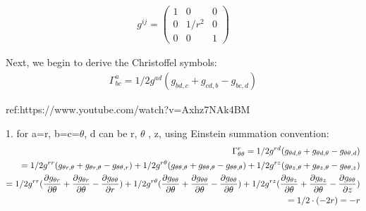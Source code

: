 \documentclass{Note}
\begin{document}
\begin{equation}
\begin{aligned}
g^{ij}=
\begin{pmatrix}
1 & 0 & 0\\ 0 &1/{r^2} & 0\\0 & 0 &1
\end{pmatrix}
\end{aligned}
\end{equation}

Next, we begin to derive the Christoffel symbols:
\begin{equation}
\begin{aligned}
\Gamma_{bc}^a=1/2 g^{ad}(g_{bd,c}+g_{cd,b}-g_{bc,d})
\end{aligned}
\end{equation}

ref:https://www.youtube.com/watch?v=Axhz7NAk4BM

1. for a=r, b=c=$\theta$, d can be r, $\theta$ , z, using Einstein summation convention:
\begin{equation}
\begin{aligned}
\Gamma_{\theta \theta}^r=1/2 g^{r d}(g_{\theta d,\theta}+g_{\theta d,\theta}-g_{\theta \theta,d})\\
=1/2 g^{r r}(g_{\theta r,\theta}+g_{\theta r,\theta}-g_{\theta \theta,r})+1/2 g^{r \theta}(g_{\theta \theta,\theta}+g_{\theta \theta,\theta}-g_{\theta \theta,\theta})+1/2 g^{r z}(g_{\theta z,\theta}+g_{\theta z,\theta}-g_{\theta \theta,z})\\
=1/2 g^{r r}({\partial g_{\theta r}\over\partial \theta}+{\partial g_{\theta r}\over\partial \theta}-{\partial g_{\theta \theta}\over\partial r})+1/2 g^{r \theta}({\partial g_{\theta \theta}\over\partial \theta}+{\partial g_{\theta \theta}\over\partial \theta}-{\partial g_{\theta \theta}\over\partial \theta})+1/2 g^{r z}({\partial g_{\theta z}\over\partial \theta}+{\partial g_{\theta z}\over\partial \theta}-{\partial g_{\theta \theta}\over\partial z})\\
=1/2\cdot (-2r)=-r
\end{aligned}
\end{equation}
\end{document}
